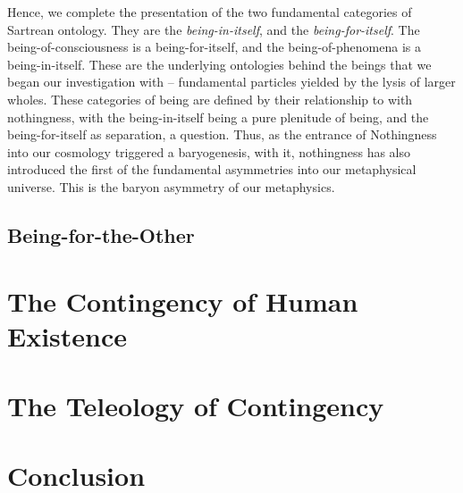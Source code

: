 Hence, we complete the presentation of the two fundamental categories of Sartrean ontology. They are the \emph{being-in-itself}, and the \emph{being-for-itself}. The being-of-consciousness is a being-for-itself, and the being-of-phenomena is a being-in-itself. These are the underlying ontologies behind the beings that we began our investigation with -- fundamental particles yielded by the lysis of larger wholes. These categories of being are defined by their relationship to with nothingness, with the being-in-itself being a pure plenitude of being, and the being-for-itself as separation, a question. Thus, as the entrance of Nothingness into our cosmology triggered a baryogenesis, with it, nothingness has also introduced the first of the fundamental asymmetries into our metaphysical universe. This is the baryon asymmetry of our metaphysics.



\section{Being-for-the-Other}



\chapter{The Contingency of Human Existence}

% 

\chapter{The Teleology of Contingency}


\chapter{Conclusion}
